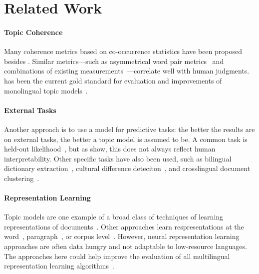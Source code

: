 \section{Related Work}
\label{sec:related}





\paragraph{Topic Coherence} 
Many coherence metrics based on co-occurrence statistics have been proposed besides \npmi{}.
Similar metrics---such as asymmetrical
word pair metrics~\cite{MimnoWTLM11} and combinations of existing
measurements~\cite{LauNB14,RoderBH15}---correlate well with human
judgments. \npmi{} has been the current gold standard for evaluation
and improvements of monolingual topic
models~\cite{Pecina10,NewmanBB11}.

\paragraph{External Tasks} 
Another approach is to use a model for predictive tasks: the better the results are
on external tasks, the better a topic model is assumed to be.
A common task is held-out likelihood~\cite{WallachMSM09,JagarlamudiD10,FukumasuEX12},
but as  show, this does not always reflect
human interpretability.
Other specific tasks have also been used,
such as bilingual dictionary extraction~\cite{LiuDM15,MaN17},
cultural difference deteciton~\cite{GutierrezSLMG16},
and crosslingual document clustering~\cite{VulicSTM15}.

\paragraph{Representation Learning}

Topic models are one example of a broad class of techniques of
learning representations of documents~\cite{bengio-13}.  Other
approaches learn respresentations at the
word~\cite{klementiev-12,vyas-15}, paragraph~\cite{mogadala-16}, or
corpus level~\cite{sogaard-15}.  However, neural representation
learning approaches are often data hungry and not adaptable to
low-resource languages.  The approaches here could help improve the
evaluation of all multilingual representation learning
algorithms~\cite{schnabel-15}.
